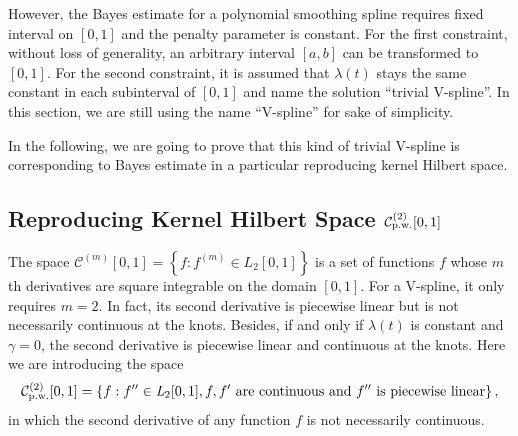 However, the Bayes estimate for a polynomial smoothing spline requires fixed interval on $[0,1]$ and the penalty parameter is constant. For the first constraint, without loss of generality, an arbitrary interval $[a,b]$ can be transformed to $[0,1]$. For the second constraint, it is assumed that $\lambda(t)$ stays the same constant in each subinterval of $[0,1]$ and name the solution ``trivial V-spline''.  In this section, we are still using the name ``V-spline'' for sake of simplicity. 

In the following, we are going to prove that this kind of trivial V-spline is corresponding to Bayes estimate in a particular reproducing kernel Hilbert space. 


\subsection{Reproducing Kernel Hilbert Space $\mathcal{C}_{\mbox{\scriptsize p.w.}}^{(2)}[0,1]$}

The space $\mathcal{C}^{(m)}[0,1]=\left\lbrace  f:f^{(m)}\in \mathit{L}_2[0,1] \right\rbrace$ is a set of functions $f$ whose $m$th derivatives are square integrable on the domain $[0,1]$. For a V-spline, it only requires $m=2$. In fact, its second derivative is piecewise linear but is not necessarily continuous at the knots. Besides, if and only if $\lambda(t)$ is constant and $\gamma=0$, the second derivative is piecewise linear and continuous at the knots. Here we are introducing the space 
\begin{equation*}
\mathcal{C}_{\mbox{\scriptsize p.w.}}^{(2)}[0,1]=\left\lbrace f: f''\in \mathit{L}_2[0,1], f,f' \mbox{ are continuous and } f'' \mbox{ is piecewise linear}\right\rbrace,
\end{equation*}
in which the second derivative of any function $f$ is not necessarily continuous. 


